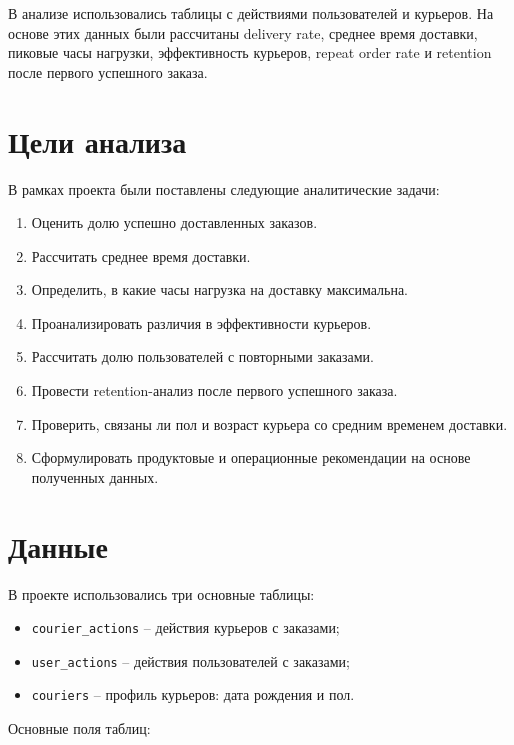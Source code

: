 \documentclass[12pt,a4paper]{article}
\begin{document}
В анализе использовались таблицы с действиями пользователей и курьеров. На основе этих данных были рассчитаны delivery rate, среднее время доставки, пиковые часы нагрузки, эффективность курьеров, repeat order rate и retention после первого успешного заказа.

\section{Цели анализа}

В рамках проекта были поставлены следующие аналитические задачи:

\begin{enumerate}
    \item Оценить долю успешно доставленных заказов.
    \item Рассчитать среднее время доставки.
    \item Определить, в какие часы нагрузка на доставку максимальна.
    \item Проанализировать различия в эффективности курьеров.
    \item Рассчитать долю пользователей с повторными заказами.
    \item Провести retention-анализ после первого успешного заказа.
    \item Проверить, связаны ли пол и возраст курьера со средним временем доставки.
    \item Сформулировать продуктовые и операционные рекомендации на основе полученных данных.
\end{enumerate}

\newpage
\section{Данные}

В проекте использовались три основные таблицы:

\begin{itemize}
    \item \texttt{courier\_actions} -- действия курьеров с заказами;
    \item \texttt{user\_actions} -- действия пользователей с заказами;
    \item \texttt{couriers} -- профиль курьеров: дата рождения и пол.
\end{itemize}

Основные поля таблиц:
\end{document}
